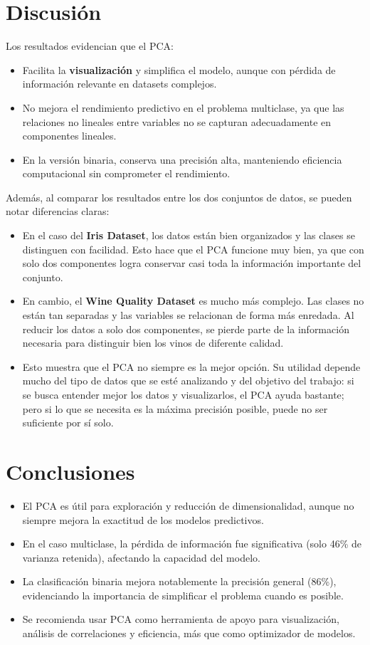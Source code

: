 \documentclass[12pt]{article}
\begin{document}
\section{Discusión}
Los resultados evidencian que el PCA:
\begin{itemize}
    \item Facilita la \textbf{visualización} y simplifica el modelo, aunque con pérdida de información relevante en datasets complejos.
    \item No mejora el rendimiento predictivo en el problema multiclase, ya que las relaciones no lineales entre variables no se capturan adecuadamente en componentes lineales.
    \item En la versión binaria, conserva una precisión alta, manteniendo eficiencia computacional sin comprometer el rendimiento.
\end{itemize}

Además, al comparar los resultados entre los dos conjuntos de datos, se pueden notar diferencias claras:

\begin{itemize}
    \item En el caso del \textbf{Iris Dataset}, los datos están bien organizados y las clases se distinguen con facilidad. Esto hace que el PCA funcione muy bien, ya que con solo dos componentes logra conservar casi toda la información importante del conjunto.
    \item En cambio, el \textbf{Wine Quality Dataset} es mucho más complejo. Las clases no están tan separadas y las variables se relacionan de forma más enredada. Al reducir los datos a solo dos componentes, se pierde parte de la información necesaria para distinguir bien los vinos de diferente calidad.
    \item Esto muestra que el PCA no siempre es la mejor opción. Su utilidad depende mucho del tipo de datos que se esté analizando y del objetivo del trabajo: si se busca entender mejor los datos y visualizarlos, el PCA ayuda bastante; pero si lo que se necesita es la máxima precisión posible, puede no ser suficiente por sí solo.
\end{itemize}

\section{Conclusiones}
\begin{itemize}
    \item El PCA es útil para exploración y reducción de dimensionalidad, aunque no siempre mejora la exactitud de los modelos predictivos.
    \item En el caso multiclase, la pérdida de información fue significativa (solo 46\% de varianza retenida), afectando la capacidad del modelo.
    \item La clasificación binaria mejora notablemente la precisión general (86\%), evidenciando la importancia de simplificar el problema cuando es posible.
    \item Se recomienda usar PCA como herramienta de apoyo para visualización, análisis de correlaciones y eficiencia, más que como optimizador de modelos.
\end{itemize}
\end{document}
